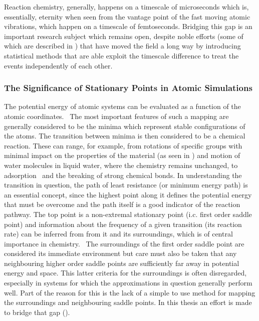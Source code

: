 Reaction chemistry, generally, happens on a timescale of microseconds which is, essentially, eternity when seen from the vantage point of the fast moving atomic vibrations, which happen on a timescale of femtoseconds.
Bridging this gap is an important research subject which remains open, despite noble efforts (some of which are described in ) that have moved the field a long way by introducing statistical methods that are able exploit the timescale difference to treat the events independently of each other.~\cite{tst-eyring-1935, tst-polanyi-1935, tst-wigner-1938, htst-wert-1949, htst-vineyard-1957, tst-1990}

\subsubsection{The Significance of Stationary Points in Atomic Simulations}
The potential energy of atomic systems can be evaluated as a function of the atomic coordinates.~\cite{born-oppenheimer-1927, schrodinger-equation-1926, kohn-1999}
The most important features of such a mapping are generally considered to be the minima which represent stable configurations of the atoms.
The transition between minima is then considered to be a chemical reaction.
These can range, for example, from rotations of specific groups with minimal impact on the properties of the material (as seen in ) and motion of water molecules in liquid water, where the chemistry remains unchanged, to adsorption~ and the breaking of strong chemical bonds.
In understanding the transition in question, the path of least resistance (or minimum energy path) is an essential concept, since the highest point along it defines the potential energy that must be overcome and the path itself is a good indicator of the reaction pathway.
The top point is a non-extremal stationary point (i.c. first order saddle point) and information about the frequency of a given transition (its reaction rate) can be inferred from from it and its surroundings, which is of central importance in chemistry.~\cite{htst-wert-1949, htst-vineyard-1957}
The surroundings of the first order saddle point are considered its immediate environment but care must also be taken that any neighbouring higher order saddle points are sufficiently far away in potential energy and space.
This latter criteria for the surroundings is often disregarded, especially in systems for which the approximations in question generally perform well.
Part of the reason for this is the lack of a simple to use method for mapping the surroundings and neighbouring saddle points.
In this thesis an effort is made to bridge that gap ().

